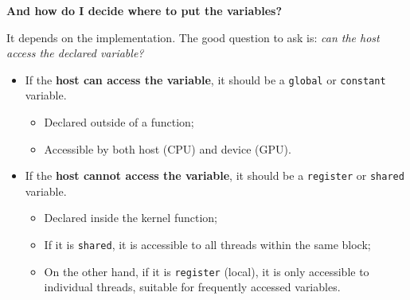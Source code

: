 \begin{flushleft}
    \textcolor{Green3}{ \textbf{And how do I decide where to put the variables?}}
\end{flushleft}
It depends on the implementation. The good question to ask is: \emph{can the host access the declared variable?}
\begin{itemize}
    \item If the \textbf{host can access the variable}, it should be a \texttt{global} or \texttt{constant} variable.
    \begin{itemize}
        \item Declared outside of a function;
        \item Accessible by both host (CPU) and device (GPU).
    \end{itemize}

    \item If the \textbf{host cannot access the variable}, it should be a \texttt{register} or \texttt{shared} variable.
    \begin{itemize}
        \item Declared inside the kernel function;
        \item If it is \texttt{shared}, it is accessible to all threads within the same block;
        \item On the other hand, if it is \texttt{register} (local), it is only accessible to individual threads, suitable for frequently accessed variables.
    \end{itemize}
\end{itemize}

